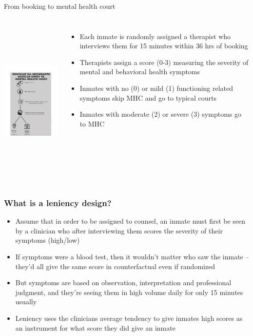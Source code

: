 \documentclass{beamer}
\begin{document}
\begin{frame}{From booking to mental health court}

  \begin{columns}
    \centering
    \includegraphics[height=8.25cm, width=5.55cm]{./lecture_includes/mhc_recidivism.pdf}
    \begin{itemize}
      \item Each inmate is randomly assigned a therapist who interviews them for 15 minutes within 36 hrs of booking
      \item Therapists assign a score (0-3) measuring the severity of mental and behavioral health symptoms
      \item Inmates with no (0) or mild (1) functioning related symptoms skip MHC and go to typical courts
      \item Inmates with moderate (2) or severe (3) symptoms go to MHC
    \end{itemize}
  \end{columns}
\end{frame}




\begin{frame}
  \frametitle{What is a leniency design?}

  \begin{itemize}
    \item Assume that in order to be assigned to counsel, an inmate must first be seen by a clinician who after interviewing them scores the severity of their symptoms (high/low)
    \item If symptoms were a blood test, then it wouldn't matter who saw the inmate -- they'd all give the same score in counterfactual even if randomized
    \item But symptoms are based on observation, interpretation and professional judgment, and they're seeing them in high volume daily for only 15 minutes usually
    \item Leniency uses the clinicians average tendency to give inmates high scores as an instrument for what score they did give an inmate
  \end{itemize}

\end{frame}
\end{document}

